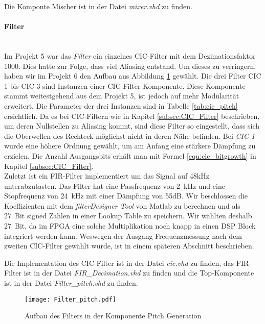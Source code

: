 Die Komponte Mischer ist in der Datei \textit{mixer.vhd} zu finden.

\paragraph{Filter}\mbox{}\\

Im Projekt 5 war das \textit{Filter} ein einzelnes CIC-Filter mit dem Dezimationsfaktor 1000. Dies hatte zur Folge, dass viel Aliasing entstand. Um dieses zu verringern, haben wir im Projekt 6 den Aufbau aus Abbildung \ref{img:Filter_Pitch} gewählt. Die drei Filter CIC 1 bis CIC 3 sind Instanzen einer CIC-Filter Komponente. Diese Komponente stammt weitestgehend aus dem Projekt 5, ist jedoch auf mehr Modularität erweitert. Die Parameter der drei Instanzen sind in Tabelle \ref{tab:cic_pitch} ersichtlich. Da es bei CIC-Filtern wie in Kapitel \ref{subsec:CIC_Filter} beschrieben, um deren Nullstellen zu Aliasing kommt, sind diese Filter so eingestellt, dass sich die Oberwellen des Rechteck möglichst nicht in deren Nähe befinden. Bei \textit{CIC 1} wurde eine höhere Ordnung gewählt, um am Anfang eine stärkere Dämpfung zu erzielen. Die Anzahl Ausgangsbits erhält man mit Formel \ref{equ:cic_bitgrowth} in Kapitel \ref{subsec:CIC_Filter}.\\
Zuletzt ist ein FIR-Filter implementiert um das Signal auf 48kHz unterabzutasten. Das Filter hat eine Passfrequenz von \SI{2}{kHz} und eine Stopfrequenz von \SI{24}{kHz} mit einer Dämpfung von 55dB. Wir beschlossen die Koeffizienten mit dem \textit{filterDesigner Tool} von Matlab zu berechnen und als \SI{27}{Bit} signed Zahlen in einer Lookup Table zu speichern. Wir wählten deshalb \SI{27}{Bit}, da im FPGA eine solche Multiplikation noch knapp in einen DSP Block integriert werden kann. \cite{Cyclone_V}
Weswegen der Ausgang Frequenzmessung nach dem zweiten CIC-Filter gewählt wurde, ist in einem späteren Abschnitt beschrieben.

Die Implementation des CIC-Filter ist in der Datei \textit{cic.vhd} zu finden, das FIR-Filter ist in der Datei \textit{FIR\_Decimation.vhd} zu finden und die Top-Komponente ist in der Datei \textit{Filter\_pitch.vhd} zu finden.


\begin{figure}[t]
	\centering
	\texttt{[image: Filter\_pitch.pdf]}
	\caption{Aufbau des Filters in der Komponente Pitch Generation} 
	\label{img:Filter_Pitch}
\end{figure}  


